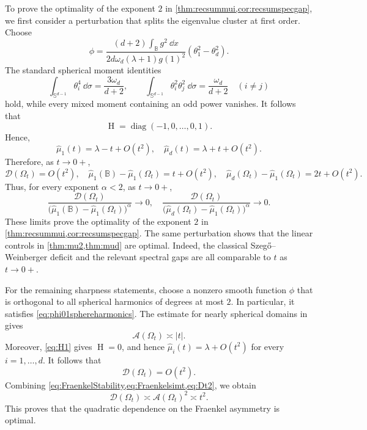 \documentclass{amsart}
\numberwithin{equation}{section}
\theoremstyle{plain}
\theoremstyle{definition}
\theoremstyle{plain}
\theoremstyle{remark}
\numberwithin{figure}{section}
\DeclareMathOperator{\diag}{diag}
\DeclareMathOperator{\hh}{H}
\newcommand{\B}{\mathbb{B}}
\newcommand{\ints}{\int_{\mathbb{S}^{d-1}}}
\newcommand{\muu}{\widehat{\mu}}
\begin{document}
To prove the optimality of the exponent $2$ in \cref{thm:recsummui,cor:recsumspecgap}, 
we first consider a perturbation that splits the eigenvalue cluster at first order. Choose
\[
    \phi=\frac{(d+2)\int_{\B}g^2~\dd x}{2d\omega_d(\lambda+1)g(1)^2}(\theta_1^2-\theta_d^2).
\]
The standard spherical moment identities
\[
    \ints\theta_i^4~\dd\sigma=\frac{3\omega_d}{d+2},\qquad \ints\theta_i^2\theta_j^2~\dd\sigma=\frac{\omega_d}{d+2}\quad(i\neq j)
\]
hold, while every mixed moment containing an odd power vanishes. It follows that
\[
    \hh=\diag(-1,0,\dots,0,1).
\]
Hence,
\[
    \muu_{1}(t)=\lambda-t+O(t^2), \quad \muu_d(t) = \lambda+t+O(t^2).
\]
Therefore, as $t\to 0+$,
\[
    \mathcal{D}(\Omega_t) = O(t^2), \quad \muu_1(\B)-\muu_1(\Omega_t)=t+ O(t^2) ,\quad \muu_d(\Omega_t)-\muu_1(\Omega_t) = 2t+O(t^2).
\]
Thus, for every exponent $\alpha<2$, as $t\to 0+$,
\[
    \frac{\mathcal{D}(\Omega_t)}{\big(\muu_1(\B)-\muu_1(\Omega_t)\big)^\alpha}\to 0,\quad \frac{\mathcal  D ({\Omega_t})}{\big(\muu_d(\Omega_t)-\muu_1(\Omega_t)\big)^\alpha}\to 0.
\]
These limits prove the optimality of the exponent $2$ in \cref{thm:recsummui,cor:recsumspecgap}. The same perturbation shows that the linear controls in \cref{thm:mu2,thm:mud} are optimal. Indeed, the classical Szeg\H{o}--Weinberger deficit and the relevant spectral gaps are all  comparable to $t$ as $t \to 0+$.

For the remaining sharpness statements, choose a nonzero smooth function $\phi$ that is orthogonal to all spherical harmonics of degrees at most $2$. In particular, it satisfies \cref{eq:phi01sphereharmonics}. The estimate for nearly spherical domains in \cite[Lemma 6.2]{BDR12} gives
\begin{equation}
    \label{eq:Fraenkelsimt}
    \mathcal{A}(\Omega_t)\asymp |t|.
\end{equation}
Moreover, \cref{eq:H1} gives $\hh=0$, and hence $\muu_i(t)=\lambda+O(t^2)$ for every $i=1,\dots,d$. It follows that
\begin{equation}
    \label{eq:Dt2}
    \mathcal{D}(\Omega_t)=O(t^2).
\end{equation}
Combining \cref{eq:FraenkelStability,eq:Fraenkelsimt,eq:Dt2}, we obtain
\[
    \mathcal{D}(\Omega_t)\asymp \mathcal{A}(\Omega_t)^2\asymp t^2.
\]
This proves that the quadratic dependence on the Fraenkel asymmetry is optimal.
\end{document}
